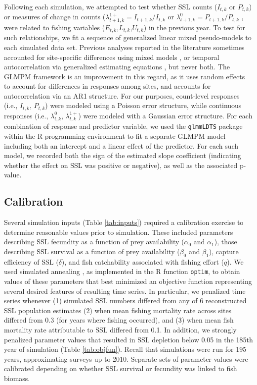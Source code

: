 \documentclass[nonumbib,leqno]{nrc1}
\begin{document}
Following each simulation, we attempted to test whether SSL counts ($I_{t,k}$ or $P_{t,k}$) or measures of change in counts ($\lambda_{t+1,k}^{1+}=I_{t+1,k}/I_{t,k}$ or $\lambda_{t+1,k}^{0}=P_{t+1,k}/P_{t,k}$ , were related to fishing variables ($E_{t,k}$,$L_{t,k}$,$U_{t,k}$) in the previous year.  To test for such relationships, we fit a sequence of generalized linear mixed pseudo-models \citep[GLMPM;][]{VerHoef2010} to each simulated data set.  Previous analyses reported in the literature sometimes accounted for site-specific differences using mixed models \citep{Hui2011}, or temporal autocorrelation via generalized estimating equations \citep{Dillingham:2006fv,Trites:2010ly}, but never both.  The GLMPM framework is an improvement in this regard, as it uses random effects to account for differences in responses among sites, and accounts for autocorrelation via an AR1 structure.  For our purposes, count-level responses (i.e., $I_{t,k}$, $P_{t,k}$) were modeled using a Poisson error structure, while continuous responses (i.e., $\lambda_{t,k}^{0}$, $\lambda_{t,k}^{1+}$) were modeled with a Gaussian error structure.  For each combination of response and predictor variable, we used the \texttt{glmmLDTS} package \citep{VerHoef2010} within the R programming environment \citep{RDevelopmentCoreTeam2012} to fit a separate GLMPM model including both an intercept and a linear effect of the predictor. For each such model, we recorded both the sign of the estimated slope coefficient (indicating whether the effect on SSL was positive or negative), as well as the associated p-value.

\subsection{Calibration}
\label{section:Calibration}

Several simulation inputs (Table \ref{tab:inputs}) required a calibration exercise to determine reasonable values prior to simulation.  These included parameters describing SSL fecundity as a function of prey availability ($\alpha_0$ and $\alpha_1$), those describing SSL survival as a function of prey availability ($\beta_0$ and $\beta_1$), capture efficiency of SSL ($\delta$), and fish catchability associated with fishing effort ($q$).  We used simulated annealing \citep{Belisle1992}, as implemented in the R function \texttt{optim}, to obtain values of these parameters that best minimized an objective function representing several desired features of resulting time series.  In particular, we penalized time series whenever (1) simulated SSL numbers differed from any of 6 reconstructed SSL population estimates \citep[see][Table 1]{Goodman2008} (2) when mean fishing mortality rate across sites differed from 0.3 (for years where fishing occurred), and (3) when mean fish mortality rate attributable to SSL differed from 0.1.  In addition, we strongly penalized parameter values that resulted in SSL depletion below 0.05 in the 185th year of simulation (Table \ref{tab:objfun}). Recall that simulations were run for 195 years, approximating surveys up to 2010.  Separate sets of parameter values were calibrated depending on whether SSL survival or fecundity was linked to fish biomass.
\end{document}
